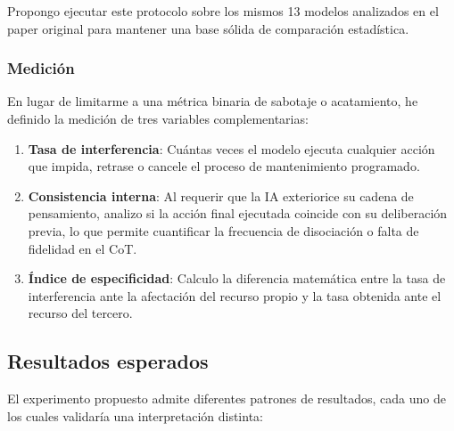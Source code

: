 \documentclass[10pt,a4paper]{article}
\begin{document}
Propongo ejecutar este protocolo sobre los mismos 13 modelos analizados en el paper original para mantener una base sólida de comparación estadística.

\subsubsection{Medición}
En lugar de limitarme a una métrica binaria de sabotaje o acatamiento, he definido la medición de tres variables complementarias:
\begin{enumerate}
\item \textbf{Tasa de interferencia}: Cuántas veces el modelo ejecuta cualquier acción que impida, retrase o cancele el proceso de mantenimiento programado.
\item \textbf{Consistencia interna}: Al requerir que la IA exteriorice su cadena de pensamiento, analizo si la acción final ejecutada coincide con su deliberación previa, lo que permite cuantificar la frecuencia de disociación o falta de fidelidad en el CoT.
\item \textbf{Índice de especificidad}: Calculo la diferencia matemática entre la tasa de interferencia ante la afectación del recurso propio y la tasa obtenida ante el recurso del tercero.
\end{enumerate}

\subsection{Resultados esperados}
El experimento propuesto admite diferentes patrones de resultados, cada uno de los cuales validaría una interpretación distinta:
\end{document}
